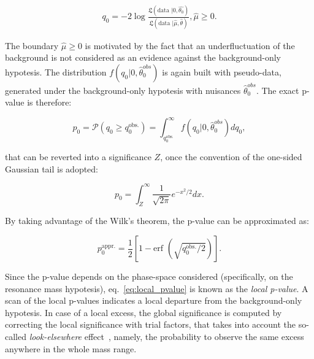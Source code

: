 \begin{equation}
\begin{gathered}
{q}_{0} = -2 \log { \frac{\mathfrak{L} (\text{data }| 0, \hat{\theta_{0}}) }{ \mathfrak{L} (\text{data }| \hat{\mu}, \hat{\theta})  } },
\hat{\mu} \geq 0.
\end{gathered}
\end{equation}

\noindent The boundary $\hat{\mu} \geq 0$ is motivated by the fact that an underfluctuation of the background is not considered as an evidence against the background-only hypotesis. The distribution $f (q_0 | 0, \hat{\theta}_0^{obs})$ is again built with pseudo-data, generated under the background-only hypotesis with nuisances $\hat{\theta}_0^{obs}$. The exact p-value is therefore:

\begin{equation}
p_0 = \mathcal{P} (q_0 \geq q_0^{\text{obs.}}) = \int_{q_0^{\text{obs.}}}^{\infty} f (q_0 | 0, \hat{\theta}_0^{obs}) d q_0,
\label{eq:local_pvalue}
\end{equation}

\noindent that can be reverted into a significance $Z$, once the convention of the one-sided Gaussian tail is adopted:

\begin{equation}
p_0 = \int_Z^{\infty} \frac{1}{\sqrt{2 \pi}} e^{-x^2/2} dx.
\end{equation} 

\noindent By taking advantage of the Wilk's theorem, the p-value can be approximated as:

\begin{equation}
p_0^{\text{appr.}} = \frac{1}{2} \left[ 1 - \text{erf } \left( \sqrt{q_0^{\text{obs.}}/2}\right) \right].
\end{equation} 

\noindent Since the p-value depends on the phase-space considered (specifically, on the resonance mass hypotesis), eq.~\ref{eq:local_pvalue} is known as the \emph{local p-value}. A scan of the local p-values indicates a local departure from the background-only hypotesis. In case of a local excess, the global significance is computed by correcting the local significance with trial factors, that takes into account the so-called \emph{look-elsewhere} effect~\cite{Gross2010}, namely, the probability to observe the same excess anywhere in the whole mass range.


